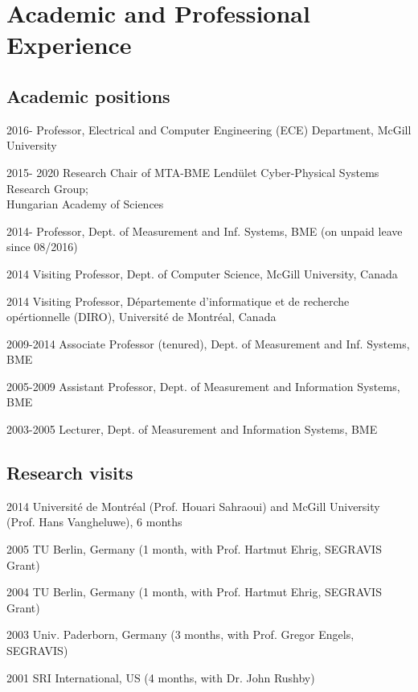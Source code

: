 \section{Academic and Professional Experience}
\subsection{Academic positions}
\begin{yearlist}
\item[2016-] Professor, Electrical and Computer Engineering (ECE) Department, McGill University
\item[2015- 2020] Research Chair of MTA-BME Lendület Cyber-Physical Systems Research Group; \\ Hungarian Academy of Sciences 
\item[2014-] Professor, Dept. of Measurement and Inf. Systems, BME  (on unpaid leave since 08/2016)
\item[2014] Visiting Professor, Dept. of Computer Science, McGill University, Canada
\item[2014] Visiting Professor, D\'epartemente d'informatique et de recherche op\'ertionnelle (DIRO), Universit\'e de Montr\'eal, Canada
\item[2009-2014] Associate Professor (tenured), Dept. of Measurement and Inf. Systems, BME 	
\item[2005-2009] Assistant Professor, Dept. of Measurement and Information Systems, BME 
\item[2003-2005] Lecturer, Dept. of Measurement and Information Systems, BME
\end{yearlist}

\subsection{Research visits} 
\begin{yearlist}
\item[2014] Universit\'e de Montr\'eal (Prof. Houari Sahraoui) and McGill University (Prof. Hans Vangheluwe),  6 months
\item[2005] TU Berlin, Germany (1 month, with Prof. Hartmut Ehrig, SEGRAVIS Grant)
\item[2004] TU Berlin, Germany (1 month, with Prof. Hartmut Ehrig, SEGRAVIS Grant)
\item[2003] Univ. Paderborn, Germany (3 months, with Prof. Gregor Engels, SEGRAVIS) 
\item[2001] SRI International, US (4 months, with Dr. John Rushby) 
\end{yearlist}

